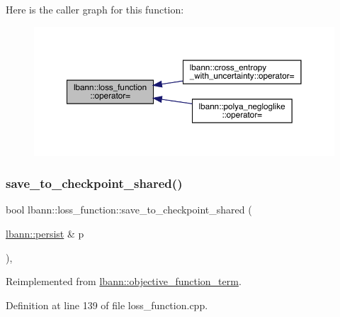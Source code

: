 Here is the caller graph for this function\+:\nopagebreak
\begin{figure}[H]
\begin{center}
\leavevmode
\includegraphics[width=350pt]{classlbann_1_1loss__function_ab882c642619ea4285b61e735d84e401c_icgraph}
\end{center}
\end{figure}
\mbox{\label{classlbann_1_1loss__function_ac44929838f3c3f0a34e1532530422dad}} 
\subsubsection{\texorpdfstring{save\+\_\+to\+\_\+checkpoint\+\_\+shared()}{save\_to\_checkpoint\_shared()}}
{\footnotesize\ttfamily bool lbann\+::loss\+\_\+function\+::save\+\_\+to\+\_\+checkpoint\+\_\+shared (\begin{DoxyParamCaption}\item[{\hyperlink{classlbann_1_1persist}{lbann\+::persist} \&}]{p }\end{DoxyParamCaption})\hspace{0.3cm}{\ttfamily [override]}, {\ttfamily [virtual]}}



Reimplemented from \hyperlink{classlbann_1_1objective__function__term_a4451a6a6fb4d70ac2aed2827f075cd71}{lbann\+::objective\+\_\+function\+\_\+term}.



Definition at line 139 of file loss\+\_\+function.\+cpp.



